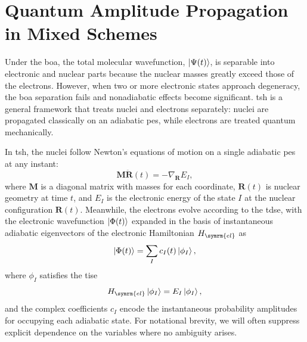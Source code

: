\section{Quantum Amplitude Propagation in Mixed Schemes}\label{sec:quantum_amplitude_propagation_in_mixed_schemes}
Under the \gls{boa}, the total molecular wavefunction, $\ket{\Psi(t)}$, is separable into electronic and nuclear parts because the nuclear masses greatly exceed those of the electrons. However, when two or more electronic states approach degeneracy, the \gls{boa} separation fails and nonadiabatic effects become significant. \gls{tsh} is a general framework that treats nuclei and electrons separately: nuclei are propagated classically on an adiabatic \gls{pes}, while electrons are treated quantum mechanically.\supercite{10.1002/wcms.64,10.1063/1.4757762}

In \gls{tsh}, the nuclei follow Newton's equations of motion on a single adiabatic \gls{pes} at any instant:
\begin{equation}
\symbf{M}\ddot{\symbf{R}}(t)=-\nabla_{\symbf{R}}E_I,
\end{equation}
where $\symbf{M}$ is a diagonal matrix with masses for each coordinate, $\symbf{R}(t)$ is nuclear geometry at time $t$, and $E_I$ is the electronic energy of the state $I$ at the nuclear configuration $\symbf{R}(t)$. Meanwhile, the electrons evolve according to the \gls{tdse}, with the electronic wavefunction $\ket{\Phi(t)}$ expanded in the basis of instantaneous adiabatic eigenvectors of the electronic Hamiltonian $H_{\symrm{el}}$ as
\begin{equation}
\ket{\Phi(t)}=\sum_I c_I(t)\ket{\phi_I},
\end{equation}
where $\phi_I$ satisfies the \gls{tise}
\begin{equation}
H_{\symrm{el}}\ket{\phi_I}=E_I\ket{\phi_I},
\end{equation}
and the complex coefficients $c_I$ encode the instantaneous probability amplitudes for occupying each adiabatic state. For notational brevity, we will often suppress explicit dependence on the variables where no ambiguity arises.

